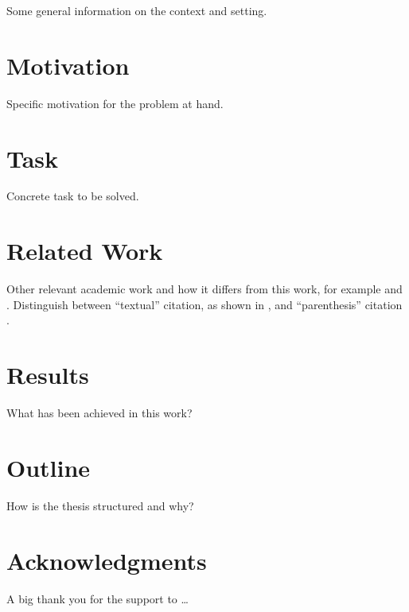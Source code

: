 \documentclass[10pt,twoside,a4paper,bibliography=totoc]{scrbook}
\begin{document}
Some general information on the context and setting. \blindtext{}

\Blindtext[2][2]

\section{Motivation}

Specific motivation for the problem at hand. \blindtext{}

\blindtext[2]

\section{Task}

Concrete task to be solved. \blindtext{}

\blindtext{}


\section{Related Work}

Other relevant academic work and how it differs from this work, for
example \citet{shannon_diff} and \citet{blowfish}. Distinguish between
``textual'' citation, as shown in \citet{shannon_diff}, and
``parenthesis'' citation \citep{blowfish}.

\Blindtext[3][1]


\section{Results}

What has been achieved in this work? \blindtext{}

\blindtext[2][1]

\section{Outline}

How is the thesis structured and why? \blindtext{}


\section{Acknowledgments}

A big thank you for the support to \ldots \blindtext


\fancyhead[RE]{\rightmark}

%
% 
\end{document}
